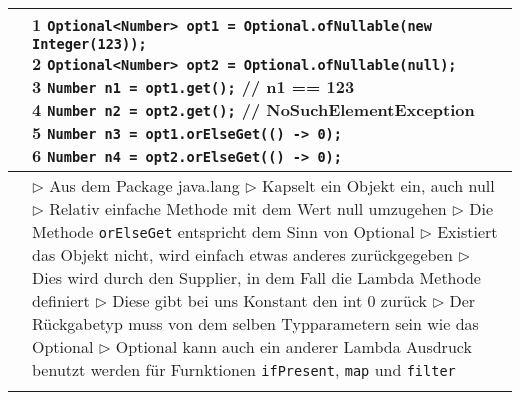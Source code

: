 	\begin{table}[H]
	\label{Optional}
	\begin{tabular}{ | p{4cm} p{13.5cm} | }
	

	\hline
	\makecell[l]{Beispiel: Prinziep} & 
	\makecell[l]
	{
	\hspace{0.3cm}  1 \hspace{0.3cm} \texttt{Optional<Number> opt1 = Optional.ofNullable(new Integer(123));} \\
	\hspace{0.3cm}  2 \hspace{0.3cm} \texttt{Optional<Number> opt2 = Optional.ofNullable(null);} \\
	\hspace{0.3cm}  3 \hspace{0.3cm} \texttt{Number n1 = opt1.get();} // n1 == 123\\
	\hspace{0.3cm}  4 \hspace{0.3cm} \texttt{Number n2 = opt2.get();} // NoSuchElementException \\
	\hspace{0.3cm}  5 \hspace{0.3cm} \texttt{Number n3 = opt1.orElseGet(() -> 0);} \\
	\hspace{0.3cm}  6 \hspace{0.3cm} \texttt{Number n4 = opt2.orElseGet(() -> 0);} \\
	} 	\\ \hline


	\makecell[l]{Funktion} & 
	\makecell[l]
	{
	$\rhd$ Aus dem Package java.lang \\
	$\rhd$ Kapselt ein Objekt ein, auch null \\
	$\rhd$ Relativ einfache Methode mit dem Wert null umzugehen \\
	$\rhd$ Die Methode \texttt{orElseGet} entspricht dem Sinn von Optional \\
	$\rhd$ Existiert das Objekt nicht, wird einfach etwas anderes zurückgegeben \\
	$\rhd$ Dies wird durch den Supplier, in dem Fall die Lambda Methode definiert \\
	$\rhd$ Diese gibt bei uns Konstant den int 0 zurück \\
	$\rhd$ Der Rückgabetyp muss von dem selben Typparametern sein wie das Optional \\
	$\rhd$ Optional kann auch ein anderer Lambda Ausdruck benutzt werden \\
	\hspace{0.35cm} für Furnktionen \texttt{ifPresent}, \texttt{map} und \texttt{filter} \\
	} 	\\ \hline


	\makecell[l]{Maps} & 
	\makecell[l]
	{
	as
	} 	\\ \hline


	\end{tabular}
	\end{table}



